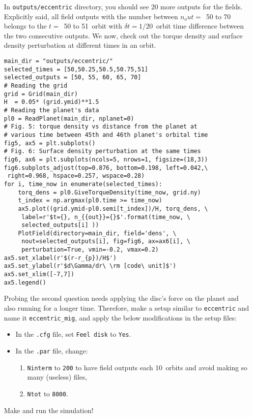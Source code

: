 \documentclass[14pt]{scrartcl}
\begin{document}
In \texttt{outputs/eccentric} directory, you should see 20 more outputs for the fields. Explicitly said, all field outputs with the number between $n_out=$~50 to 70 belongs to the $t=$~50 to 51~orbit with $\delta t=1/20$~orbit time difference between the two consecutive outputs. We now, check out the torque density and surface density perturbation at different times in an orbit.
	\begin{verbatim}
main_dir = "outputs/eccentric/"
selected_times = [50,50.25,50.5,50.75,51]
selected_outputs = [50, 55, 60, 65, 70]
# Reading the grid
grid = Grid(main_dir)
H  = 0.05* (grid.ymid)**1.5
# Reading the planet's data
pl0 = ReadPlanet(main_dir, nplanet=0)
# Fig. 5: torque density vs distance from the planet at 
# various time between 45th and 46th planet's orbital time
fig5, ax5 = plt.subplots()
# Fig. 6: Surface density perturbation at the same times
fig6, ax6 = plt.subplots(ncols=5, nrows=1, figsize=(18,3))
fig6.subplots_adjust(top=0.876, bottom=0.198, left=0.042,\
 right=0.968, hspace=0.257, wspace=0.28)
for i, time_now in enumerate(selected_times):
    torq_dens = pl0.GiveTorqueDensity(time_now, grid.ny)
    t_index = np.argmax(pl0.time >= time_now)
    ax5.plot((grid.ymid-pl0.semi[t_index])/H, torq_dens, \
     label=r'$t={}, n_{{out}}={}$'.format(time_now, \
     selected_outputs[i] ))
    PlotField(directory=main_dir, field='dens', \
     nout=selected_outputs[i], fig=fig6, ax=ax6[i], \
     perturbation=True, vmin=-0.2, vmax=0.2)
ax5.set_xlabel(r'$(r-r_{p})/H$')
ax5.set_ylabel(r'$d\Gamma/dr\ \rm [code\ unit]$')
ax5.set_xlim([-7,7])
ax5.legend()

\end{verbatim}

Probing the second question needs applying the disc's force on the planet and also running for a longer time. Therefore, make a setup similar to \texttt{eccentric} and name it \texttt{eccentric\_mig}, and apply the below modifications in the setup files:
\begin{itemize}
	\item In the \texttt{.cfg} file, set \texttt{Feel disk} to \texttt{Yes}.
	\item In the \texttt{.par} file, change:
	\begin{enumerate}
		\item \texttt{Ninterm} to \texttt{200} to have field outputs each 10~orbits and avoid making so many (useless) files,
		\item \texttt{Ntot} to \texttt{8000}.
	\end{enumerate}
\end{itemize}
Make and run the simulation!
\end{document}
